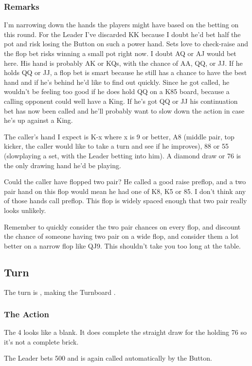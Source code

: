 \subsubsection*{Remarks}
I'm narrowing down the hands the players might have based on the betting
on this round. For the Leader I've discarded KK because I doubt he'd bet
half the pot and risk losing the Button on such a power hand. Sets love
to check-raise and the flop bet risks winning a small pot right now. I doubt AQ
or AJ would bet here. His hand is probably AK or KQs, with the chance
of AA, QQ, or JJ. If he holds QQ or JJ, a flop bet is smart because
he still has a chance to have the best hand and if he's behind he'd like
to find out quickly. Since he got called, he wouldn't be feeling too good
if he does hold QQ on a K85 board, because a calling opponent could
well have a King. If he's got QQ or JJ his continuation bet has now
been called and he'll probably want to slow down the action in case
he's up against a King.

The caller's hand I expect is K-x where x is 9 or better, A8 (middle pair,
top kicker, the caller would like to take a turn and see if he improves),
88 or 55 (slowplaying a set, with the Leader betting into him). A diamond
draw or 76 is the only drawing hand he'd be playing.

Could the caller have flopped two pair? He called a good raise preflop,
and a two pair hand on this flop would mean he had one of K8, K5 or 85.
I don't think any of those hands call preflop. This flop is widely spaced
enough that two pair really looks unlikely.

Remember to quickly consider the two pair chances on every flop, and
discount the chance of someone having two pair on a wide flop, and
consider them a lot better on a narrow flop like QJ9. This shouldn't
take you too long at the table.

\subsection*{Turn}

The turn is \fours, making the Turnboard \Kc\eigd\fived\fours.

\subsubsection*{The Action}
The 4 looks like a blank. It does complete the straight draw for
the holding 76 so it's not a complete brick.

The Leader bets 500 and is again called automatically by
the Button.

